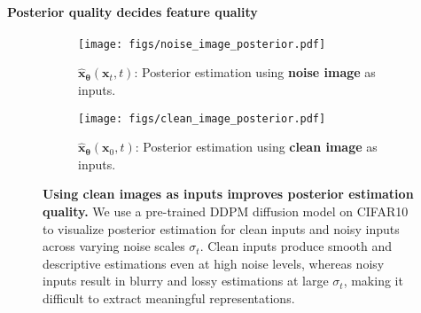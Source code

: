 


\paragraph{Posterior quality decides feature quality}\label{subsec:posterior}

\begin{figure*}[t]
    \begin{center}
    \begin{subfigure}{0.98\textwidth}
    \texttt{[image: figs/noise\_image\_posterior.pdf]}
    \caption{$\hat{\bm x}_{\bm \theta}(\bm x_t, t)$: Posterior estimation using \textbf{noise image} as inputs.} 
    \end{subfigure} \quad %
    \begin{subfigure}{0.98\textwidth}
    \texttt{[image: figs/clean\_image\_posterior.pdf]}
    \caption{$\hat{\bm x}_{\bm \theta}(\bm x_0, t)$: Posterior estimation using \textbf{clean image} as inputs.} 
    \end{subfigure}
    \end{center}
    \vspace{-0.1in}
\caption{\textbf{Using clean images as inputs improves posterior estimation quality.} We use a pre-trained DDPM diffusion model on CIFAR10 to visualize posterior estimation for clean inputs and noisy inputs across varying noise scales $\sigma_t$. Clean inputs produce smooth and descriptive estimations even at high noise levels, whereas noisy inputs result in blurry and lossy estimations at large $\sigma_t$, making it difficult to extract meaningful representations.}
\label{fig:clean_vs_noise}
\end{figure*}

